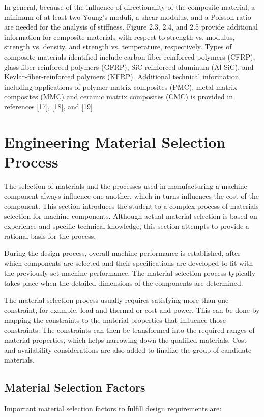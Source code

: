 \documentclass[a4paper,openany,12pt]{book}
\begin{document}
In general, because of the influence of directionality of the composite
material, a minimum of at least two Young's moduli, a shear modulus, and
a Poisson ratio are needed for the analysis of stiffness. Figure 2.3,
2.4, and 2.5 provide additional information for composite materials with
respect to strength vs. modulus, strength vs. density, and strength vs.
temperature, respectively. Types of composite materials identified
include carbon-fiber-reinforced polymers (CFRP), glass-fiber-reinforced
polymers (GFRP), SiC-reinforced aluminum (Al-SiC), and
Kevlar-fiber-reinforced polymers (KFRP). Additional technical
information including applications of polymer matrix composites (PMC),
metal matrix composites (MMC) and ceramic matrix composites (CMC) is
provided in references [17], [18], and [19]

\section{Engineering Material Selection Process}
\label{engineering-material-selection-process}
The selection of materials and the processes used in manufacturing a
machine component always influence one another, which in turns
influences the cost of the component. This section introduces the
student to a complex process of materials selection for machine
components. Although actual material selection is based on experience
and specific technical knowledge, this section attempts to provide a
rational basis for the process.

During the design process, overall machine performance is established,
after which components are selected and their specifications are
developed to fit with the previously set machine performance. The
material selection process typically takes place when the detailed
dimensions of the components are determined.

The material selection process usually requires satisfying more than one
constraint, for example, load and thermal or cost and power. This can be
done by mapping the constraints to the material properties that
influence those constraints. The constraints can then be transformed
into the required ranges of material properties, which helps narrowing
down the qualified materials. Cost and availability considerations are
also added to finalize the group of candidate materials.

\subsection{Material Selection Factors}
\label{material-selection-factors}
Important material selection factors to fulfill design requirements are:
\end{document}
